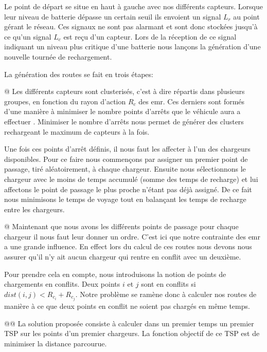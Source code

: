 \documentclass[noposter]{polytech}
\begin{document}
	
	Le point de départ se situe en haut à gauche avec nos différents capteurs.
	Lorsque leur niveau de batterie dépasse un certain seuil ils envoient un signal $L_r$ au point gérant le réseau.
	Ces signaux ne sont pas alarmant et sont donc stockées jusqu'à ce qu'un signal $L_c$ est reçu d'un capteur.
	Lors de la réception de ce signal indiquant un niveau plus critique d'une batterie nous lançons la génération d'une nouvelle tournée de rechargement.
	
	La génération des routes se fait en trois étapes:
	
	\begin{easylist}
		@ Les différents capteurs sont clusterisés, c'est à dire répartis dans plusieurs groupes, en fonction du rayon d'action $R_c$ des \gls{emr}.
		Ces derniers sont formés d'une manière à minimiser le nombre points d'arrêts que le véhicule aura a effectuer \cite{KHELLADI201744}.
		Minimiser le nombre d'arrêts nous permet de générer des clusters rechargeant le maximum de capteurs à la fois.
		
		Une fois ces points d'arrêt définis, il nous faut les affecter à l'un des chargeurs disponibles.
		Pour ce faire nous commençons par assigner un premier point de passage, tiré aléatoirement, à chaque chargeur.
		Ensuite nous sélectionnons le chargeur avec le moins de temps accumulé (somme des temps de recharge) et lui affectons le point de passage le plus proche n'étant pas déjà assigné.
		De ce fait nous minimisons le temps de voyage tout en balançant les temps de recharge entre les chargeurs.
		
		@ Maintenant que nous avons les différents points de passage pour chaque chargeur il nous faut leur donner un ordre.
		C'est ici que notre contrainte des \gls{emr} a une grande influence.
		En effect lors du calcul de ces routes nous devons nous assurer qu'il n'y ait aucun chargeur qui rentre en conflit avec un deuxième.
		
		Pour prendre cela en compte, nous introduisons la notion de points de chargements en conflits.
		Deux points $i$ et $j$ sont en conflits si $dist\left(i,j\right)<R_{c_i}+R_{c_j}$.
		Notre problème se ramène donc à calculer nos routes de manière à ce que deux points en conflit ne soient pas chargés en même temps.
		
		@@ La solution proposée consiste à calculer dans un premier temps un premier TSP sur les points d'un premier chargeurs.
		La fonction objectif de ce TSP est de minimiser la distance parcourue.
		

\end{easylist}
\end{document}
